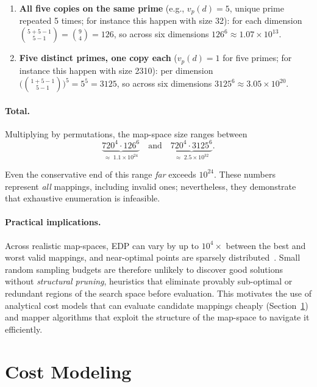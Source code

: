 \begin{enumerate}
  \item \textbf{All five copies on the same prime}
    (e.g., $v_p(d) = 5$, unique prime repeated 5 times; for instance this happen with size 32): 
for each dimension
    $\binom{5 + 5 - 1}{5 - 1} = \binom{9}{4} = 126$,
    so across six dimensions $126^{6} \approx 1.07 \times 10^{13}$.

  \item \textbf{Five distinct primes, one copy each}
    ($v_{p}(d) = 1$ for five primes; for instance this happen with size 2310):
    per dimension
    $\bigl(\binom{1 + 5 - 1}{5 - 1}\bigr)^{5} = 5^{5} = 3125$,
    so across six dimensions $3125^{6} \approx 3.05 \times 10^{20}$.
\end{enumerate}

\paragraph{Total.}
Multiplying by permutations, the map-space size ranges between
\[
  \underbrace{720^{4} \cdot 126^{6}}_{\approx\;1.1 \times 10^{24}}
  \quad\text{and}\quad
  \underbrace{720^{4} \cdot 3125^{6}}_{\approx\;2.5 \times 10^{32}}.
\]

Even the conservative end of this range \emph{far} exceeds
$10^{24}$.
These numbers represent \emph{all} mappings, including invalid ones;
nevertheless, they demonstrate that exhaustive enumeration is
infeasible.

\paragraph{Practical implications.}
Across realistic map-spaces, EDP can vary by up to $10^{4}\times$
between the best and worst valid mappings, and near-optimal points are
sparsely distributed~\cite{kao2020gamma}.
Small random sampling budgets are therefore unlikely to discover good
solutions without \emph{structural pruning}, heuristics that
eliminate provably sub-optimal or redundant regions of the search
space before evaluation.
This motivates the use of analytical cost models that can evaluate
candidate mappings cheaply (Section~\ref{sec:bg-cost-model}) and
mapper algorithms that exploit the structure of the map-space to
navigate it efficiently.

\section{Cost Modeling}
\label{sec:bg-cost-model}

